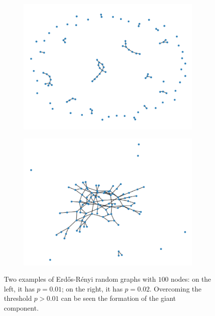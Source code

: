 \begin{figure}[ht!]
    \centering
    \begin{subfigure}[t]{0.49\textwidth}
        \centering
        \includegraphics[width=\linewidth]{image/E_R_N100_p0,01.png}
    \end{subfigure}
    \hfill
    \begin{subfigure}[t]{0.49\textwidth}
        \centering
        \includegraphics[width=\linewidth]{image/E_R_N100_p0,02.png}
    \end{subfigure}
    \caption{Two examples of Erd\H{o}s-Rényi random graphs with $100$ nodes: on the left, it has $p = 0.01$; on the right, it has $p = 0.02$. Overcoming the threshold $p > 0.01$ can be seen the formation of the giant component.}
    \label{E-R_example}
\end{figure}

